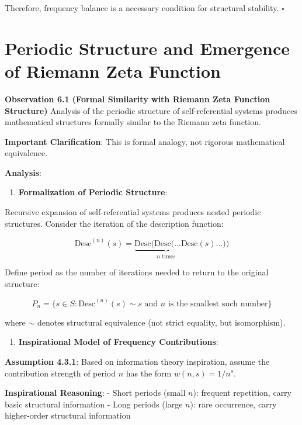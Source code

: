 Therefore, frequency balance is a necessary condition for structural stability. $\square$

\section{Periodic Structure and Emergence of Riemann Zeta Function}
\label{sec:ch06_riemann:periodic-structure-and-emergence-of-riemann-zeta-function}

\textbf{Observation 6.1 (Formal Similarity with Riemann Zeta Function Structure)}
\label{thm:4.3}
Analysis of the periodic structure of self-referential systems produces mathematical structures formally similar to the Riemann zeta function.

\textbf{Important Clarification}: This is formal analogy, not rigorous mathematical equivalence.

\textbf{Analysis}:

\begin{enumerate}
\item \textbf{Formalization of Periodic Structure}:
\end{enumerate}
   Recursive expansion of self-referential systems produces nested periodic structures. Consider the iteration of the description function:
   
\begin{equation}
\text{Desc}^{(n)}(s) = \underbrace{\text{Desc}(\text{Desc}(...\text{Desc}}_{n \text{ times}}(s)...))
\end{equation}
   
   Define period as the number of iterations needed to return to the original structure:
   
\begin{equation}
P_n = \{s \in S: \text{Desc}^{(n)}(s) \sim s \text{ and } n \text{ is the smallest such number}\}
\end{equation}
   
   where $\sim$ denotes structural equivalence (not strict equality, but isomorphism).

\begin{enumerate}
\item \textbf{Inspirational Model of Frequency Contributions}:
\end{enumerate}
   
   \textbf{Assumption 4.3.1}: Based on information theory inspiration, assume the contribution strength of period $n$ has the form $w(n,s) = 1/n^s$.
   
   \textbf{Inspirational Reasoning}:
   - Short periods (small $n$): frequent repetition, carry basic structural information
   - Long periods (large $n$): rare occurrence, carry higher-order structural information
   
